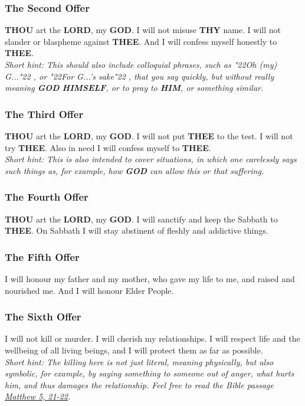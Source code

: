 \documentclass[12pt,a4paper]{article}
\newcommand{\God}[0]{\textbf{GOD}}
\newcommand{\Him}[0]{\textbf{HIM}}
\newcommand{\Himself}[0]{\textbf{HIMSELF}}
\newcommand{\Lord}[0]{\textbf{LORD}}
\newcommand{\Thee}[0]{\textbf{THEE}}
\newcommand{\Thou}[0]{\textbf{THOU}}
\newcommand{\Thy}[0]{\textbf{THY}}
\newcommand{\q}[1]{\char"22{#1}\char"22 }
\begin{document}
	\subsubsection{The Second Offer}
		{\Thou} art the {\Lord},
		my {\God}.
		I will not misuse {\Thy} name.
		I will not slander or blaspheme against {\Thee}.
		And I will confess myself honestly to {\Thee}.
		\\
		\textit{Short hint:
		This should also include colloquial phrases,
		such as \q{Oh (my) G...},
		or \q{For G...'s sake},
		that you say quickly,
		but without really meaning {\God} {\Himself},
		or to pray to {\Him},
		or something similar.}
			
	\subsubsection{The Third Offer}
		{\Thou} art the {\Lord},
		my {\God}.
		I will not put {\Thee} to the test.
		I will not try {\Thee}.
		Also in need I will confess myself to {\Thee}.
		\\
		\textit{Short hint:
		This is also intended to cover situations,
		in which one carelessly says such things as,
		for example,
		how {\God} can allow this or that suffering.}
		
	\subsubsection{The Fourth Offer}
		{\Thou} art the {\Lord},
		my {\God}.
		I will sanctify and keep the Sabbath to {\Thee}.
		On Sabbath I will stay abstinent of fleshly
		and addictive things.
		
	\subsubsection{The Fifth Offer}
		I will honour my father and my mother,
		who gave my life to me,
		and raised and nourished me.
		And I will honour Elder People.
			
	\subsubsection{The Sixth Offer} \label{TheSixthOffer}
		I will not kill or murder.
		I will cherish my relationships.
		I will respect life and the wellbeing of all living beings,
		and I will protect them as far as possible.
		\\
		\textit{Short hint:
		The killing here is not just literal,
		meaning physically,
		but also symbolic,
		for example,
		by saying something to someone out of anger,
		what hurts him,
		and thus damages the relationship.
		Feel free to read the Bible passage \href{https://www.die-bibel.de/bibeln/online-bibeln/lesen/ESV/MAT.5/Matthew-5}{Matthew 5, 21-22}.}
		
\end{document}
